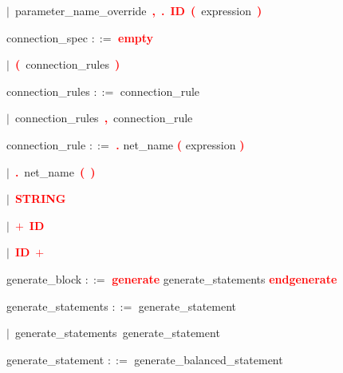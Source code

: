 \mbox{$|$ parameter\_name\_override \textbf{\textcolor{red}{,}} \textbf{\textcolor{red}{.}} \textbf{\textcolor{red}{ID}} \textbf{\textcolor{red}{(}} expression \textbf{\textcolor{red}{)}}}

\vspace{1em}
\noindent
\settowidth{\parindent}{\hspace{4ex}}
connection\_spec $::=$\hspace{1ex} \textbf{\textcolor{red}{empty}}

\mbox{$|$ \textbf{\textcolor{red}{(}} connection\_rules \textbf{\textcolor{red}{)}}}

\vspace{1em}
\noindent
\settowidth{\parindent}{\hspace{4ex}}
connection\_rules $::=$\hspace{1ex} connection\_rule

\mbox{$|$ connection\_rules \textbf{\textcolor{red}{,}} connection\_rule}

\vspace{1em}
\noindent
\settowidth{\parindent}{\hspace{4ex}}
connection\_rule $::=$\hspace{1ex} \textbf{\textcolor{red}{.}} net\_name \textbf{\textcolor{red}{(}} expression \textbf{\textcolor{red}{)}}

\mbox{$|$ \textbf{\textcolor{red}{.}} net\_name \textbf{\textcolor{red}{(}} \textbf{\textcolor{red}{)}}}

\mbox{$|$ \textbf{\textcolor{red}{STRING}}}

\mbox{$|$ \textbf{\textcolor{red}{$+$}} \textbf{\textcolor{red}{ID}}}

\mbox{$|$ \textbf{\textcolor{red}{ID}} \textbf{\textcolor{red}{$+$}}}

\vspace{1em}
\noindent
\settowidth{\parindent}{\hspace{4ex}}
generate\_block $::=$\hspace{1ex} \textbf{\textcolor{red}{generate}} generate\_statements \textbf{\textcolor{red}{endgenerate}}

\vspace{1em}
\noindent
\settowidth{\parindent}{\hspace{4ex}}
generate\_statements $::=$\hspace{1ex} generate\_statement

\mbox{$|$ generate\_statements generate\_statement}

\vspace{1em}
\noindent
\settowidth{\parindent}{\hspace{4ex}}
generate\_statement $::=$\hspace{1ex} generate\_balanced\_statement

